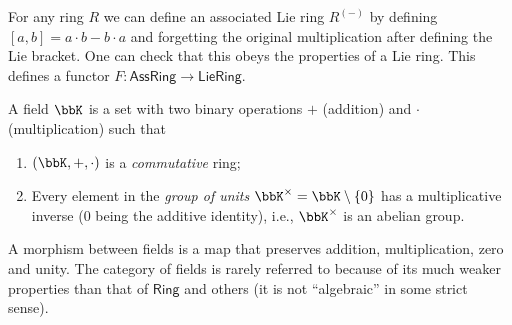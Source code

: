 \begin{example}
For any ring $R$ we can define an associated Lie ring $R^{(-)}$
by defining $[a,b]=a\cdot b-b\cdot a$ and forgetting the original multiplication
after defining the Lie bracket. One can check
that this obeys the properties of a Lie ring. This defines a functor
$F:\mathsf{AssRing}\rightarrow\mathsf{LieRing}$.
\end{example}
\begin{defn}[Field]
    A field $\bbK$ is a set with two binary operations $+$ (addition)
    and $\cdot$ (multiplication) such that
    \begin{enumerate}
    \item $(\bbK,+,\cdot)$ is a \emph{commutative} ring;
    \item Every element in the \emph{group of units} $\bbK^{\times}=\bbK\setminus\{0\}$ has a multiplicative
    inverse ($0$ being the additive identity), i.e., $\bbK^{\times}$ is an abelian group.
    \end{enumerate}
    A morphism between fields is a map that preserves addition, multiplication,
    zero and unity. The category of fields is rarely referred to because
    of its much weaker properties than that of $\mathsf{Ring}$ and others
    (it is not ``algebraic'' in some strict sense).
\end{defn}
%
